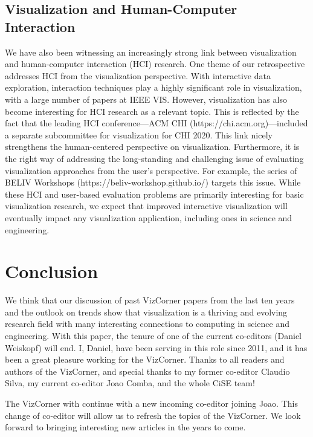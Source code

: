 \documentclass[10pt,journal,compsoc]{IEEEtran}
\begin{document}
\subsection{Visualization and Human-Computer Interaction}

We have also been witnessing an increasingly strong link between visualization and human-computer interaction (HCI) research. One theme of our retrospective addresses HCI from the visualization perspective. With interactive data exploration, interaction techniques play a highly significant role in visualization, with a large number of papers at IEEE VIS. However, visualization has also become interesting for HCI research as a relevant topic. This is reflected by the fact that the leading HCI conference---ACM CHI (https://chi.acm.org)---included a separate subcommittee for visualization for CHI 2020. This link nicely strengthens the human-centered perspective on visualization.
Furthermore, it is the right way of addressing the long-standing and challenging issue of evaluating visualization approaches from the user's perspective. For example, the series of BELIV Workshops (https://beliv-workshop.github.io/) targets this issue. While these HCI and user-based evaluation problems are primarily interesting for basic visualization research, we expect that improved interactive visualization will eventually impact any visualization application, including ones in science and engineering.


\section{Conclusion}

We think that our discussion of past VizCorner papers from the last ten years and the outlook on trends show that visualization is a thriving and evolving research field with many interesting connections to computing in science and engineering. With this paper, the tenure of one of the current co-editors (Daniel Weiskopf) will end. 
I, Daniel, have been serving in this role since 2011, and it has been a great pleasure working for the VizCorner. Thanks to all readers and authors of the VizCorner, and special thanks to my former co-editor Claudio Silva, my current co-editor Joao Comba, and the whole CiSE team!

The VizCorner with continue with a new incoming co-editor joining Joao. This change of co-editor will allow us to refresh the topics of the VizCorner. We look forward to bringing interesting new articles in the years to come.
\end{document}
